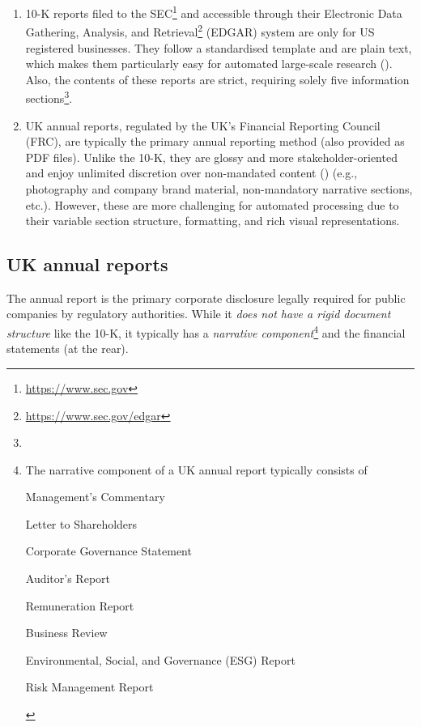 \begin{enumerate}
    \item 10-K reports filed to the SEC\footnote{\url{https://www.sec.gov}} and accessible through their Electronic Data Gathering, Analysis, and Retrieval\footnote{\url{https://www.sec.gov/edgar}} (EDGAR) system are only for US registered businesses.
    They follow a standardised template and are plain text, which makes them particularly easy for automated large-scale research (\cite{el-haj2019retrieving}).
    Also, the contents of these reports are strict, requiring solely five information sections\footnote{
    }.
    \item UK annual reports, regulated by the UK's Financial Reporting Council (FRC), are typically the primary annual reporting method (also provided as PDF files).
    Unlike the 10-K, they are glossy and more stakeholder-oriented and enjoy unlimited discretion over non-mandated content (\cite{el-haj2019retrieving}) (e.g., photography and company brand material, non-mandatory narrative sections, etc.).
    However, these are more challenging for automated processing due to their variable section structure, formatting, and rich visual representations.
\end{enumerate}

\subsection{UK annual reports}\label{subsec:uk-annual-reports}
The annual report is the primary corporate disclosure legally required for public companies by regulatory authorities.
While it \emph{does not have a rigid document structure} like the 10-K, it typically has a \emph{narrative component}\footnote{The narrative component of a UK annual report typically consists of
\begin{enumerate*}
    \item Management's Commentary
    \item Letter to Shareholders
    \item Corporate Governance Statement
    \item Auditor's Report
    \item Remuneration Report
    \item Business Review
    \item Environmental, Social, and Governance (ESG) Report
    \item Risk Management Report
\end{enumerate*}
} and the financial statements (at the rear).

